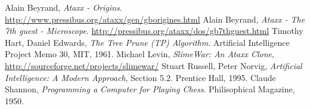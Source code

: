 \documentclass[12pt]{article}
\begin{document}
\begin{thebibliography}{9}
Alain Beyrand, \textsl{Ataxx - Origins}. \url{http://www.pressibus.org/ataxx/gen/gborigines.html}
Alain Beyrand, \textsl{Ataxx - The 7th guest - Microscope}. \url{http://pressibus.org/ataxx/dos/gb7thguest.html}
Timothy Hart, Daniel Edwards, \textsl{The Tree Prune (TP) Algorithm}.  Artificial Intelligence Project Memo 30, MIT, 1961.
Michael Levin, \textsl{SlimeWar: An Ataxx Clone}, \url{http://sourceforge.net/projects/slimewar/}
Stuart Russell, Peter Norvig, \textsl{Artificial Intelligence: A Modern Approach}, Section 5.2.  Prentice Hall, 1995.
Claude Shannon, \textsl{Programming a Computer for Playing Chess}.  Philisophical Magazine, 1950.
\end{thebibliography}
\end{document}
